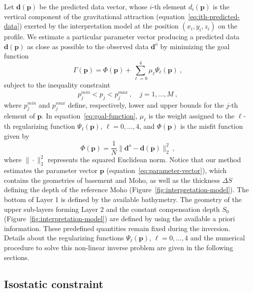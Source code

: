 \documentclass[manuscript,revised]{geophysics}
\begin{document}
Let $\mathbf{d}(\mathbf{p})$ be the predicted data vector, whose $i$-th element
$d_{i}(\mathbf{p})$ is the vertical component of the gravitational attraction
(equation~\ref{eq:ith-predicted-data}) exerted by the interpretation model
at the position $(x_{i}, y_{i}, z_{i})$ on the profile.
We estimate a particular parameter vector producing a predicted data
$\mathbf{d}(\mathbf{p})$ as close as possible to the observed data 
$\mathbf{d}^{o}$ by minimizing the goal function
\begin{equation}
\Gamma (\mathbf{p}) = \Phi(\mathbf{p}) + \sum_{\ell = 0}^{4} \mu_{\ell}
\Psi_{\ell}(\mathbf{p}) \: ,
\label{eq:goal-function}
\end{equation}
subject to the inequality constraint 
\begin{equation}
p_{j}^{min} < p_{j} < p_{j}^{max} \: , \quad j = 1, \dots, M \: ,
\label{eq:inequality-constraint}
\end{equation}
where $p_{j}^{min}$ and $p_{j}^{max}$ define, respectively, lower and upper bounds 
for the $j$-th element of $\mathbf{p}$.
In equation~\ref{eq:goal-function}, $\mu_{\ell}$ is the weight assigned to the 
$\ell$-th regularizing function $\Psi_{\ell}(\mathbf{p})$, $\ell = 0, \dots, 4$, and
$\Phi(\mathbf{p})$ is the misfit function given by
\begin{equation}
\Phi(\mathbf{p}) = \frac{1}{N} \| \mathbf{d}^{o} - \mathbf{d}(\mathbf{p}) \|_{2}^{2} 
\: , 
\label{eq:misfit-function}
\end{equation}
where $\| \cdot \|_{2}^{2}$ represents the squared Euclidean norm. 
Notice that our method estimates the parameter vector $\mathbf{p}$ 
(equation~\ref{eq:parameter-vector}), which contains the geometries of 
basement and Moho, as well as the thickness $\Delta S$ defining
the depth of the reference Moho (Figure~\ref{fig:interpretation-model}).
The bottom of Layer 1 is defined by the available bathymetry. The geometry of the 
upper sub-layers forming Layer 2 and the constant compensation depth $S_{0}$ 
(Figure~\ref{fig:interpretation-model}) are defined by using the available a 
priori information.
These predefined quantities remain fixed during the inversion.
Details about the regularizing functions $\Psi_{\ell}(\mathbf{p})$, $\ell = 0, \dots, 4$ 
and the numerical procedure to solve this non-linear inverse problem are given in the 
following sections.


\subsection{Isostatic constraint}
\end{document}
